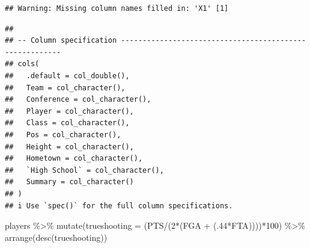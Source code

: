 \documentclass[
]{book}
\newenvironment{Shaded}{\begin{snugshade}}{\end{snugshade}}
\newcommand{\AttributeTok}[1]{\textcolor[rgb]{0.77,0.63,0.00}{#1}}
\newcommand{\DecValTok}[1]{\textcolor[rgb]{0.00,0.00,0.81}{#1}}
\newcommand{\FunctionTok}[1]{\textcolor[rgb]{0.00,0.00,0.00}{#1}}
\newcommand{\NormalTok}[1]{#1}
\newcommand{\SpecialCharTok}[1]{\textcolor[rgb]{0.00,0.00,0.00}{#1}}
\begin{document}
\begin{verbatim}
## Warning: Missing column names filled in: 'X1' [1]
\end{verbatim}

\begin{verbatim}
## 
## -- Column specification --------------------------------------------------------
## cols(
##   .default = col_double(),
##   Team = col_character(),
##   Conference = col_character(),
##   Player = col_character(),
##   Class = col_character(),
##   Pos = col_character(),
##   Height = col_character(),
##   Hometown = col_character(),
##   `High School` = col_character(),
##   Summary = col_character()
## )
## i Use `spec()` for the full column specifications.
\end{verbatim}

\begin{Shaded}
\begin{Highlighting}[]
\NormalTok{players }\SpecialCharTok{\%\textgreater{}\%}
  \FunctionTok{mutate}\NormalTok{(}\AttributeTok{trueshooting =}\NormalTok{ (PTS}\SpecialCharTok{/}\NormalTok{(}\DecValTok{2}\SpecialCharTok{*}\NormalTok{(FGA }\SpecialCharTok{+}\NormalTok{ (.}\DecValTok{44}\SpecialCharTok{*}\NormalTok{FTA))))}\SpecialCharTok{*}\DecValTok{100}\NormalTok{) }\SpecialCharTok{\%\textgreater{}\%}
  \FunctionTok{arrange}\NormalTok{(}\FunctionTok{desc}\NormalTok{(trueshooting))}
\end{Highlighting}
\end{Shaded}
\end{document}
